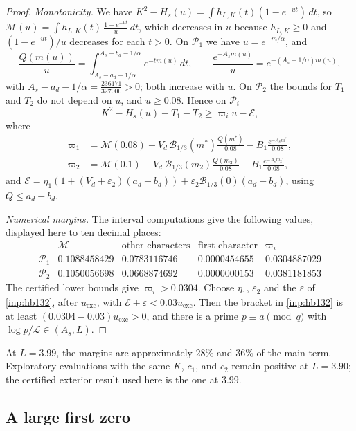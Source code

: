 \documentclass[11pt]{amsart}
\numberwithin{equation}{section}
\theoremstyle{plain}
\theoremstyle{definition}
\theoremstyle{remark}
\newcommand{\LL}{\mathcal{L}}
\newcommand{\eps}{\varepsilon}
\newcommand{\1}{\mathbf{1}}
\begin{document}
\begin{proof}
\emph{Monotonicity.} We have $K^2-H_s(u)=\int h_{L,K}(t)(1-e^{-ut})\,dt$, so
$\mathcal M(u)=\int h_{L,K}(t)\,\frac{1-e^{-ut}}u\,dt$, which decreases in $u$ because $h_{L,K}\ge0$ and
$(1-e^{-ut})/u$ decreases for each $t>0$. On $\mathcal P_1$ we have
$u=e^{-m/\alpha}$, and
\[
  \frac{Q(m(u))}u=\int_{A_s-a_d-1/\alpha}^{A_s-b_d-1/\alpha}e^{-tm(u)}\,dt,\qquad\frac{e^{-A_sm(u)}}u=e^{-(A_s-1/\alpha)m(u)},
\]
with $A_s-a_d-1/\alpha=\frac{236171}{327000}>0$; both increase with $u$. On $\mathcal P_2$ the bounds for $T_1$ and
$T_2$ do not depend on $u$, and $u\ge0.08$. Hence on $\mathcal P_i$
\[
  K^2-H_s(u)-T_1-T_2\ge\varpi_iu-\mathcal E,
\]
where
\begin{align*}
  \varpi_1&=\mathcal M(0.08)-V_d\,\mathcal B_{1/3}(m^*)\frac{Q(m^*)}{0.08}-B_1\frac{e^{-A_sm^*}}{0.08},\\
  \varpi_2&=\mathcal M(0.1)-V_d\,\mathcal B_{1/3}(m_2)\frac{Q(m_2)}{0.08}-B_1\frac{e^{-A_sm_2'}}{0.08},
\end{align*}
and $\mathcal E=\eta_1(1+(V_d+\eps_2)(a_d-b_d))+\eps_2\mathcal B_{1/3}(0)(a_d-b_d)$, using $Q\le a_d-b_d$.

\emph{Numerical margins.} The interval computations give the following values,
displayed here to ten decimal places:
\[
  \begin{array}{lcccc}
    & \mathcal M & \text{other characters} & \text{first character} & \varpi_i\\
    \mathcal P_1 & 0.1088458429 & 0.0783116746 & 0.0000454655 & 0.0304887029\\
    \mathcal P_2 & 0.1050056698 & 0.0668874692 & 0.0000000153 & 0.0381181853
  \end{array}
\]
The certified lower bounds give $\varpi_i>0.0304$. Choose $\eta_1$, $\eps_2$ and the $\eps$ of \cref{inp:hb132}, after $u_{\mathrm{exc}}$, with
$\mathcal E+\eps<0.03u_{\mathrm{exc}}$. Then the bracket in \cref{inp:hb132} is at least $(0.0304-0.03)u_{\mathrm{exc}}>0$, and there is a
prime $p\equiv a\pmod q$ with $\log p/\LL\in(A_s,L)$.
\end{proof}

At $L=3.99$, the margins are approximately $28\%$ and $36\%$ of the main term.
Exploratory evaluations with the same $K$, $c_1$, and $c_2$ remain positive at $L=3.90$;
the certified exterior result used here is the one at $3.99$.

\subsection{A large first zero}\label{subsec:large}
\end{document}
